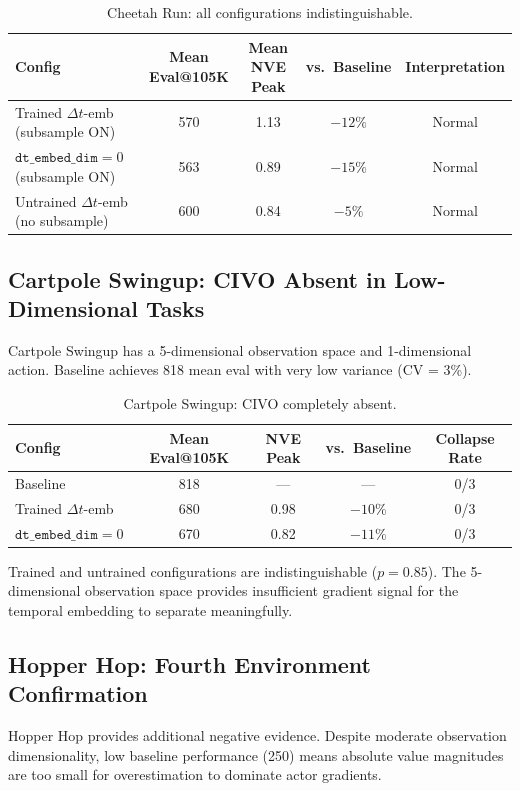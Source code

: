 \documentclass[letterpaper]{article}
\begin{document}
\begin{table}[h]
\centering
\caption{Cheetah Run: all configurations indistinguishable.}
\label{tab:cheetah_all}
\begin{tabular}{lcccc}
\toprule
Config & Mean Eval@105K & Mean NVE Peak & vs.\ Baseline & Interpretation \\
\midrule
Trained $\Delta t$-emb (subsample ON) & 570 & 1.13 & $-12\%$ & Normal \\
$\texttt{dt\_embed\_dim}=0$ (subsample ON) & 563 & 0.89 & $-15\%$ & Normal \\
Untrained $\Delta t$-emb (no subsample) & 600 & 0.84 & $-5\%$ & Normal \\
\bottomrule
\end{tabular}
\end{table}

\subsection{Cartpole Swingup: CIVO Absent in Low-Dimensional Tasks}

Cartpole Swingup has a 5-dimensional observation space and 1-dimensional action. Baseline achieves 818 mean eval with very low variance (CV = 3\%).

\begin{table}[h]
\centering
\caption{Cartpole Swingup: CIVO completely absent.}
\label{tab:cartpole}
\begin{tabular}{lcccc}
\toprule
Config & Mean Eval@105K & NVE Peak & vs.\ Baseline & Collapse Rate \\
\midrule
Baseline & 818 & --- & --- & 0/3 \\
Trained $\Delta t$-emb & 680 & 0.98 & $-10\%$ & 0/3 \\
$\texttt{dt\_embed\_dim}=0$ & 670 & 0.82 & $-11\%$ & 0/3 \\
\bottomrule
\end{tabular}
\end{table}

Trained and untrained configurations are indistinguishable ($p = 0.85$). The 5-dimensional observation space provides insufficient gradient signal for the temporal embedding to separate meaningfully.

\subsection{Hopper Hop: Fourth Environment Confirmation}

Hopper Hop provides additional negative evidence. Despite moderate observation dimensionality, low baseline performance (250) means absolute value magnitudes are too small for overestimation to dominate actor gradients.
\end{document}

